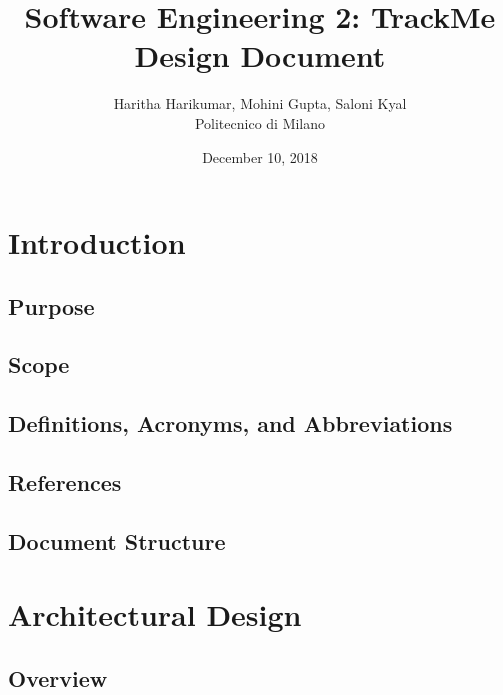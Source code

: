 \documentclass[12pt, a4paper]{report}
\begin{document}
\title{Software Engineering 2: TrackMe \\ \vspace{1em} Design Document}
\author{Haritha Harikumar, Mohini Gupta, Saloni Kyal\\
Politecnico di Milano}
\date{December 10, 2018}
\maketitle
\tableofcontents

\chapter{Introduction}
\label{ch:introduction}

\section{Purpose}


\section{Scope}


\section{Definitions, Acronyms, and Abbreviations}


\section{References}


\section{Document Structure}


\chapter{Architectural Design}
\label{ch:architectural_design}

\section{Overview}

\end{document}
